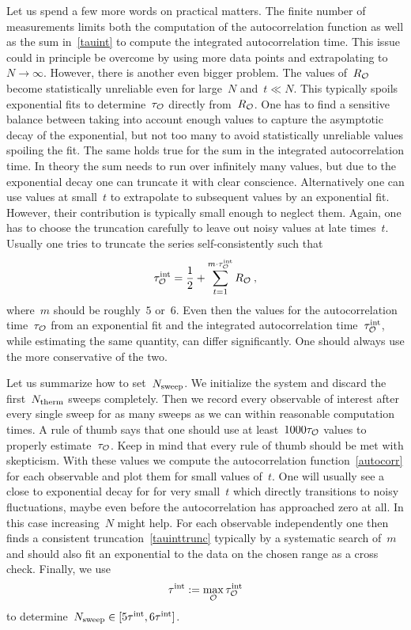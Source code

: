 Let us spend a few more words on practical matters. The finite number of
measurements limits both the computation of the autocorrelation function as well
as the sum in~\eqref{tauint} to compute the integrated autocorrelation time.
This issue could in principle be overcome by using more data points and
extrapolating to~$N\to \infty$. However, there is another even bigger problem.
The values of~$R_{\mathcal{O}}$ become statistically unreliable even for large~$N$
and~$t\ll N$. This typically spoils exponential fits to determine~$\tau_{\mathcal{O}}$
directly from~$R_{\mathcal{O}}$. One has to find a sensitive balance between taking into
account enough values to capture the asymptotic decay of the exponential, but
not too many to avoid statistically unreliable values spoiling the fit. The same
holds true for the sum in the integrated autocorrelation time. In theory the sum
needs to run over infinitely many values, but due to the exponential decay one
can truncate it with clear conscience.  Alternatively one can use values at
small~$t$ to extrapolate to subsequent values by an exponential fit. However,
their contribution is typically small enough to neglect them.  Again, one has to
choose the truncation carefully to leave out noisy values at late times~$t$.
Usually one tries to truncate the series self-consistently such that
%
\begin{equation}\label{tauinttrunc}
  \tau^{\mathrm{int}}_{\mathcal{O}} = \frac{1}{2} + \sum_{t=1}^{m \cdot \tau^{\mathrm{int}}_{\mathcal{O}}} R_{\mathcal{O}}\:,
\end{equation}
%
where~$m$ should be roughly~$5$ or~$6$. Even then the values for the
autocorrelation time~$\tau_{\mathcal{O}}$ from an exponential fit and the integrated
autocorrelation time~$\tau^{\mathrm{int}}_{\mathcal{O}}$, while estimating the same quantity, can
differ significantly. One should always use the more conservative of the two.

Let us summarize how to set~$N_{\mathrm{sweep}}$. We initialize the system and discard the
first~$N_{\mathrm{therm}}$ sweeps completely. Then we record every observable of interest
after every single sweep for as many sweeps as we can within reasonable
computation times. A rule of thumb says that one should use at least~$1000
\tau_{\mathcal{O}}$ values to properly estimate~$\tau_{\mathcal{O}}$. Keep in mind that every
rule of thumb should be met with skepticism. With these values we compute the
autocorrelation function~\eqref{autocorr} for each observable and plot them for
small values of~$t$. One will usually see a close to exponential decay for for
very small~$t$ which directly transitions to noisy fluctuations, maybe even
before the autocorrelation has approached zero at all. In this case
increasing~$N$ might help. For each observable independently one then finds a
consistent truncation~\eqref{tauinttrunc} typically by a systematic search
of~$m$ and should also fit an exponential to the data on the chosen range as a
cross check. Finally, we use
%
\begin{equation}
  \tau^{\mathrm{int}} := \max_{\mathcal{O}} \tau^{\mathrm{int}}_{\mathcal{O}}
\end{equation}
%
to determine~$N_{\mathrm{sweep}} \in  [5 \tau^{\mathrm{int}}, 6 \tau^{\mathrm{int}}]$.

